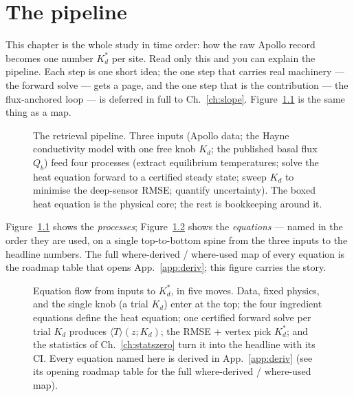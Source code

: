 \documentclass[11pt]{report}
\newcommand{\Tm}{\langle T\rangle}
\begin{document}
\chapter{The pipeline}\label{ch:pipeline}

This chapter is the whole study in time order: how the raw Apollo record becomes
one number $K_d^{*}$ per site. Read only this and you can explain the pipeline.
Each step is one short idea; the one step that carries real machinery --- the
forward solve --- gets a page, and the one step that is the contribution --- the
flux-anchored loop --- is deferred in full to Ch.~\ref{ch:slope}.
Figure~\ref{fig:pipeline} is the same thing as a map.

\begin{figure}[htbp]\centering

\caption{The retrieval pipeline. Three inputs (Apollo data; the Hayne
conductivity model with one free knob $K_d$; the published basal flux $Q_b$)
feed four processes (extract equilibrium temperatures; solve the heat equation
forward to a certified steady state; sweep $K_d$ to minimise the deep-sensor
RMSE; quantify uncertainty). The boxed heat equation is the physical core; the
rest is bookkeeping around it.}
\label{fig:pipeline}
\end{figure}

Figure~\ref{fig:pipeline} shows the \emph{processes}; Figure~\ref{fig:eqnflow}
shows the \emph{equations} --- named in the order they are used, on a single
top-to-bottom spine from the three inputs to the headline numbers. The full
where-derived / where-used map of every equation is the roadmap table that opens
App.~\ref{app:deriv}; this figure carries the story.

\begin{figure}[p]\centering

\caption{Equation flow from inputs to $K_d^{*}$, in five moves. Data, fixed
physics, and the single knob (a trial $K_d$) enter at the top; the four
ingredient equations define the heat equation; one certified forward solve per
trial $K_d$ produces $\Tm(z;K_d)$; the RMSE + vertex pick $K_d^{*}$; and the
statistics of Ch.~\ref{ch:statszero} turn it into the headline with its CI.
Every equation named here is derived in App.~\ref{app:deriv} (see its opening
roadmap table for the full where-derived / where-used map).}
\label{fig:eqnflow}
\end{figure}
\end{document}
